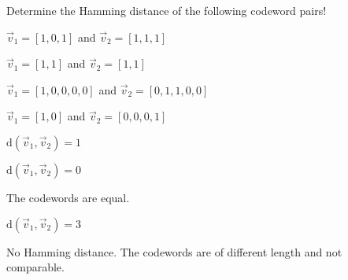 \begin{question}[subtitle={Hamming Distance}]
	Determine the Hamming distance of the following codeword pairs!
	
	\begin{tasks}
		\task
		$\vec{v}_1 = \left[1, 0, 1\right]$ and $\vec{v}_2 = \left[1, 1, 1\right]$
		
		\task
		$\vec{v}_1 = \left[1, 1\right]$ and $\vec{v}_2 = \left[1, 1\right]$
		
		\task
		$\vec{v}_1 = \left[1, 0, 0, 0, 0\right]$ and $\vec{v}_2 = \left[0, 1, 1, 0, 0\right]$
		
		\task
		$\vec{v}_1 = \left[1, 0\right]$ and $\vec{v}_2 = \left[0, 0, 0, 1\right]$
	\end{tasks}
\end{question}

\begin{solution}
	\begin{tasks}
		\task
		$\mathrm{d}\left(\vec{v}_1, \vec{v}_2\right) = 1$
		
		\task
		$\mathrm{d}\left(\vec{v}_1, \vec{v}_2\right) = 0$
		
		The codewords are equal.
		
		\task
		$\mathrm{d}\left(\vec{v}_1, \vec{v}_2\right) = 3$
		
		\task
		No Hamming distance. The codewords are of different length and not comparable.
	\end{tasks}
\end{solution}

